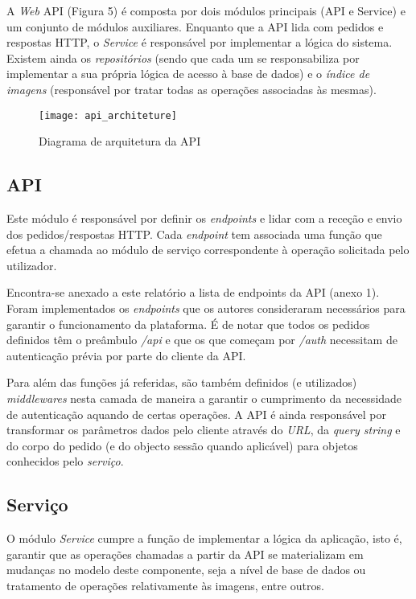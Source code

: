 A \textit{Web} API (Figura 5) é composta por dois módulos principais (API e Service) e um conjunto de módulos auxiliares. Enquanto que a API lida com pedidos e respostas HTTP, o \textit{Service} é responsável por implementar a lógica do sistema. Existem ainda os \textit{repositórios} (sendo que cada um se responsabiliza por implementar a sua própria lógica de acesso à base de dados) e o \textit{índice de imagens} (responsável por tratar todas as operações associadas às mesmas).~\cite{nodejs_the_right_way}\par \medskip

\begin{figure}[h]
	\centering
	\texttt{[image: api\_architeture]}
	\caption{Diagrama de arquitetura da API}
\end{figure}

\subsection{API}
Este módulo é responsável por definir os \textit{endpoints} e lidar com a receção e envio dos pedidos/respostas HTTP. Cada \textit{endpoint} tem associada uma função que efetua a chamada ao módulo de serviço correspondente à operação solicitada pelo utilizador. \par \medskip

Encontra-se anexado a este relatório a lista de endpoints da API (anexo 1). Foram implementados os \textit{endpoints} que os autores consideraram necessários para garantir o funcionamento da plataforma. É de notar que todos os pedidos definidos têm o preâmbulo \textit{/api} e que os que começam por \textit{/auth} necessitam de autenticação prévia por parte do cliente da API. \par \medskip

Para além das funções já referidas, são também definidos (e utilizados) \textit{middlewares} nesta camada de maneira a garantir o cumprimento da necessidade de autenticação aquando de certas operações. A API é ainda responsável por transformar os parâmetros dados pelo cliente através do \textit{URL}, da \textit{query string} e do corpo do pedido (e do objecto sessão quando aplicável) para objetos conhecidos pelo \textit{serviço}. \medskip

\subsection{Serviço}
O módulo \textit{Service} cumpre a função de implementar a lógica da aplicação, isto é, garantir que as operações chamadas a partir da API se materializam em mudanças no modelo deste componente, seja a nível de base de dados ou tratamento de operações relativamente às imagens, entre outros. \par \medskip

